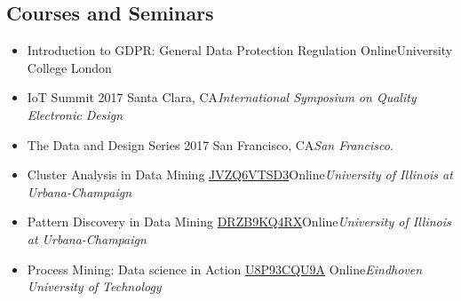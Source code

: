 \documentclass[11pt,letterpaper,sans]{moderncv}        %
\begin{document}
\subsection{Courses and Seminars}

\vspace{5pt}

\begin{itemize}



\item{
{Introduction to GDPR: General Data Protection Regulation}
{Online}{University College London}
{}}

\item{
{IoT Summit 2017 }{Santa Clara, CA}{\textit{International Symposium on Quality Electronic Design}}{}}

\item{
{The Data and Design Series 2017 }{San Francisco, CA}{\textit{San Francisco.}}{}}

\item{
{Cluster Analysis in Data Mining \href{https://www.coursera.org/account/accomplishments/certificate/JVZQ6VTSD3}{JVZQ6VTSD3}}{Online}{\textit{University of Illinois at Urbana-Champaign}}{}}

\item{
{Pattern Discovery in Data Mining \href{https://www.coursera.org/account/accomplishments/certificate/DRZB9KQ4RX}{DRZB9KQ4RX}}{Online}{\textit{University of Illinois at Urbana-Champaign}}{}}

\item{
{Process Mining: Data science in Action  \href{https://www.coursera.org/account/accomplishments/certificate/U8P93CQU9A}{U8P93CQU9A} }{Online}{\textit{Eindhoven University of Technology }}{}}






\end{itemize}
\end{document}
